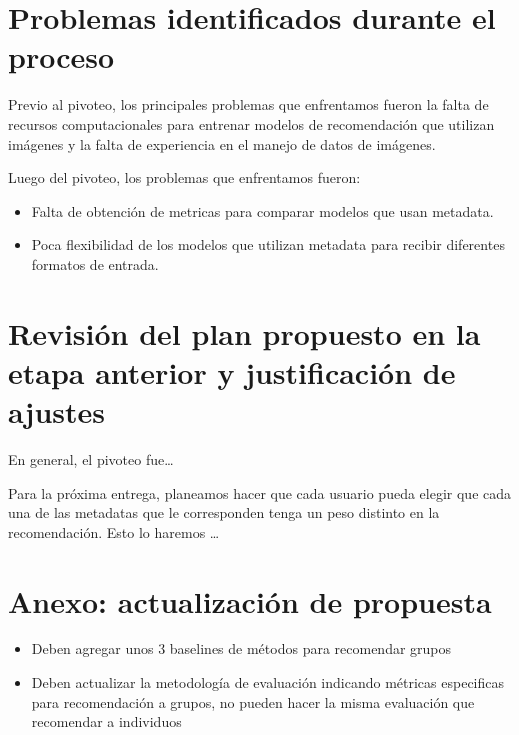 \documentclass[11pt]{article}
\begin{document}
\section{Problemas identificados durante el proceso} 

Previo al pivoteo, los principales problemas que enfrentamos fueron la falta de recursos computacionales para entrenar modelos de recomendación que utilizan imágenes y la falta de experiencia en el manejo de datos de imágenes. %

Luego del pivoteo, los problemas que enfrentamos fueron:
\begin{itemize}
    \item Falta de obtención de metricas para comparar modelos que usan metadata.
    \item Poca flexibilidad de los modelos que utilizan metadata para recibir diferentes formatos de entrada.
\end{itemize}

\section{Revisión del plan propuesto en la etapa anterior y justificación de ajustes} 

En general, el pivoteo fue\dots %

Para la próxima entrega, planeamos hacer que cada usuario pueda elegir que cada una de las metadatas que le corresponden tenga un peso distinto en la recomendación. Esto lo haremos \dots %

\section{Anexo: actualización de propuesta}
\begin{itemize}
    \item Deben agregar unos 3 baselines de métodos para recomendar grupos
    \item Deben actualizar la metodología de evaluación indicando métricas especificas para recomendación a grupos, no pueden hacer la misma evaluación que recomendar a individuos
\end{itemize}
\end{document}
